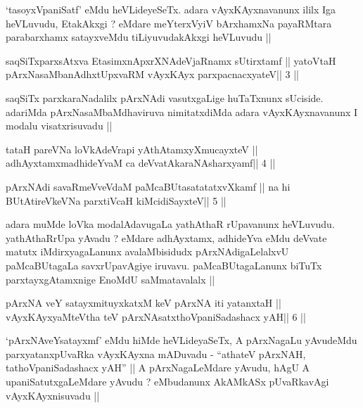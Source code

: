 \begin{artha}
`tasoyxVpaniSatf' eMdu heVLideyeSeTx. adara vAyxKAyxnavanunx ililx Iga
  heVLuvudu, EtakAkxgi ? eMdare meYterxVyiV bArxhamxNa payaRMtara
  parabarxhamx satayxveMdu tiLiyuvudakAkxgi heVLuvudu ||
\end{artha}




\begin{shl}
saqSiTxparxsAtxva EtasimxnApxrXNAdeVjaRnamx sUtirxtamf ||
yatoV\s taH pArxNasaMbanAdhxtUpxvaRM vAyxKAyx parxpacnacxyateV\hfill || 3 ||
\end{shl}

\begin{artha}
saqSiTx parxkaraNadalilx pArxNAdi vasutxgaLige huTaTxnunx sUciside.
adariMda pArxNasaMbaMdhaviruva nimitatxdiMda adara vAyxKAyxnavanunx I
modalu visatxrisuvadu ||
\end{artha}

\begin{shl}
tataH pareVNa loVkAdeVrapi yAthAtamxyXmucayxteV ||
adhAyxtamxmadhideYvaM ca deVvatAkaraNAsharxyamf\hfill || 4 ||
\end{shl}

\begin{shl}
pArxNAdi savaRmeVveVdaM paMcaBUtasatatatxvXkamf ||
na hi BUtAtireVkeVNa parxtiVcaH kiMcidiSayxteV\hfill || 5 ||
\end{shl}

\begin{artha}
adara muMde loVka modalAdavugaLa yathAthaR rUpavanunx
heVLuvudu. yathAthaRrUpa yAvadu ? eMdare adhAyxtamx, adhideYva eMdu
deVvate matutx iMdirxyagaLanunx avalaMbisidudx pArxNAdigaLelalxvU
paMcaBUtagaLa savxrUpavAgiye iruvavu. paMcaBUtagaLanunx biTuTx
parxtayxgAtamxnige EnoMdU saMmatavalalx ||
\end{artha}

\begin{shl}
pArxNA veY satayxmituyxkatxM keV pArxNA iti yatanxtaH ||
vAyxKAyxyaMteV\s tha teV pArxNAsatxthoVpaniSadashacx yAH\hfill || 6 ||
\end{shl}

\begin{artha}
`pArxNAveYsatayxmf' eMdu hiMde heVLideyaSeTx, A pArxNagaLu yAvudeMdu
  parxyatanxpUvaRka vAyxKAyxna mADuvadu - ``athateV pArxNAH,
  tathoVpaniSadashacx yAH'' || A pArxNagaLeMdare yAvudu, hAgU A
  upaniSatutxgaLeMdare yAvudu ? eMbudanunx AkAMkASx pUvaRkavAgi
  vAyxKAyxnisuvadu ||
\end{artha}


